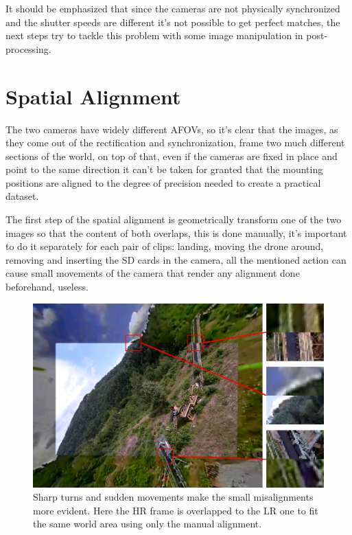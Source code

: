 It should be emphasized that since the cameras are not physically synchronized and the shutter speeds are different it's not possible to get perfect matches, the next steps try to tackle this problem with some image manipulation in post-processing.

\section{Spatial Alignment}
\label{sec:spatial_align}

The two cameras have widely different AFOVs, so it's clear that the images, as they come out of the rectification and synchronization, frame two much different sections of the world, on top of that, even if the cameras are fixed in place and point to the same direction it can't be taken for granted that the mounting positions are aligned to the degree of precision needed to create a practical dataset.

The first step of the spatial alignment is geometrically transform one of the two images so that the content of both overlaps, this is done manually, it's important to do it separately for each pair of clips: landing, moving the drone around, removing and inserting the SD cards in the camera, all the mentioned action can cause small movements of the camera that render any alignment done beforehand, useless.

\begin{figure}[H]
  \centering
  \includegraphics[scale=1.5]{figures/HR_on_LR_M_err_highlight.png}
  \caption{Sharp turns and sudden movements make the small misalignments more evident. Here the HR frame is overlapped to the LR one to fit the same world area using only the manual alignment.}
  \label{img:align_err}
\end{figure}

